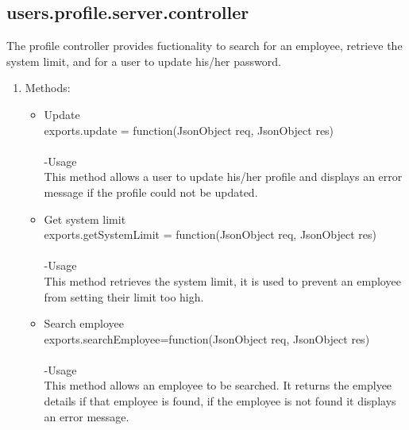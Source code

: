 \documentclass[a4paper,12pt]{report}
\begin{document}
\subsection{users.profile.server.controller}
 The profile controller provides fuctionality to search for an employee, retrieve the system limit, and for a user to update his/her password.
 \begin{enumerate}
 \item Methods:
 	\begin{itemize}
 		\item Update\\ 
 		exports.update = function(JsonObject req, JsonObject res)\\ \\ 
 		-Usage\\
 		This method allows a user to update his/her profile and displays an error message if the profile could not be updated. 
 		\item Get system limit\\ 
 		exports.getSystemLimit = function(JsonObject req, JsonObject res)\\ \\
 		-Usage\\
		 This method retrieves the system limit, it is used to prevent an employee from setting their limit too high.
 		\item Search employee\\
 		exports.searchEmployee=function(JsonObject req, JsonObject res)\\ \\ 
 		-Usage\\
		 This method allows an employee to be searched. It returns the emplyee details if that employee is found, if the employee is not found it displays an error message.
 	\end{itemize}
 \end{enumerate}
\end{document}
